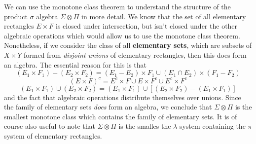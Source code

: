 We can use the monotone class theorem to understand the structure of the product $\sigma$ algebra $\Sigma \otimes \Pi$ in more detail. We know that the set of all elementary rectangles $E \times F$ is closed under intersection, but isn't closed under the other algebraic operations which would allow us to use the monotone class theorem. Nonetheless, if we consider the class of all {\bf elementary sets}, which are subsets of $X \times Y$ formed from {\it disjoint unions} of elementary rectangles, then this does form an algebra. The essential reason for this is that
%
\[ (E_1 \times F_1) - (E_2 \times F_2) = (E_1 - E_2) \times F_1 \cup (E_1 \cap E_2) \times (F_1 - F_2) \]
\[ (E \times F)^c = E^c \times F \cup E \times F^c \cup E^c \times F^c \]
\[ (E_1 \times F_1) \cup (E_2 \times F_2) = (E_1 \times F_1) \cup [(E_2 \times F_2) - (E_1 \times F_1)] \]
%
and the fact that algebraic operations distribute themselves over unions. Since the family of elementary sets {\it does} form an algebra, we conclude that $\Sigma \otimes \Pi$ is the smallest monotone class which contains the family of elementary sets. It is of course also useful to note that $\Sigma \otimes \Pi$ is the smalles the $\lambda$ system containing the $\pi$ system of elementary rectangles.

